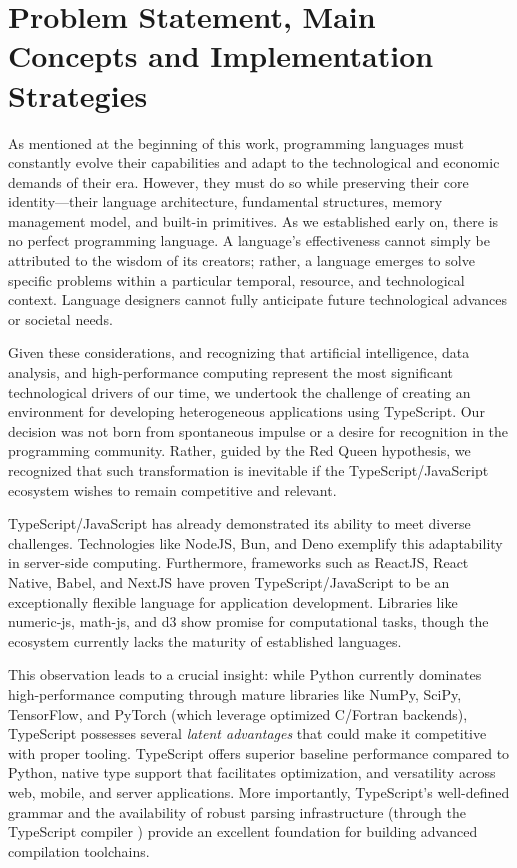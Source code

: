 \section{Problem Statement, Main Concepts and Implementation Strategies}

As mentioned at the beginning of this work, programming languages must constantly evolve their capabilities and adapt to the technological and economic demands of their era. However, they must do so while preserving their core identity---their language architecture, fundamental structures, memory management model, and built-in primitives. As we established early on, there is no perfect programming language. A language's effectiveness cannot simply be attributed to the wisdom of its creators; rather, a language emerges to solve specific problems within a particular temporal, resource, and technological context. Language designers cannot fully anticipate future technological advances or societal needs.

Given these considerations, and recognizing that artificial intelligence, data analysis, and high-performance computing represent the most significant technological drivers of our time, we undertook the challenge of creating an environment for developing heterogeneous applications using TypeScript. Our decision was not born from spontaneous impulse or a desire for recognition in the programming community. Rather, guided by the Red Queen hypothesis, we recognized that such transformation is inevitable if the TypeScript/JavaScript ecosystem wishes to remain competitive and relevant.

TypeScript/JavaScript has already demonstrated its ability to meet diverse challenges. Technologies like NodeJS, Bun, and Deno exemplify this adaptability in server-side computing. Furthermore, frameworks such as ReactJS, React Native, Babel, and NextJS have proven TypeScript/JavaScript to be an exceptionally flexible language for application development. Libraries like numeric-js, math-js, and d3 show promise for computational tasks, though the ecosystem currently lacks the maturity of established  languages.

This observation leads to a crucial insight: while Python currently dominates high-performance computing through mature libraries like NumPy, SciPy, TensorFlow, and PyTorch (which leverage optimized C/Fortran backends), TypeScript possesses several \textit{latent advantages} that could make it competitive with proper tooling. TypeScript offers superior baseline performance compared to Python, native type support that facilitates optimization, and versatility across web, mobile, and server applications. More importantly, TypeScript's well-defined grammar and the availability of robust parsing infrastructure (through the TypeScript compiler ) provide an excellent foundation for building advanced compilation toolchains.


